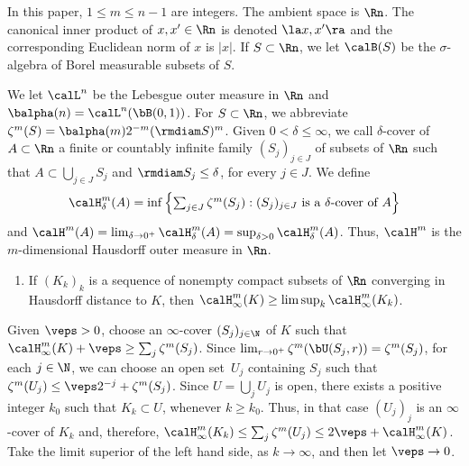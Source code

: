 \begin{Empty}[]
In this paper, $1 \leq m \leq n-1$ are integers.
The ambient space is $\Rn$.
The canonical inner product of $x,x' \in \Rn$ is denoted $\la x,x' \ra$ and the corresponding Euclidean norm of $x$ is $|x|$.
If $S \subset \Rn$, we let $\calB(S)$ be the $\sigma$-algebra of Borel measurable subsets of $S$.
\end{Empty}

\begin{Empty}
\label{h.m}
We let $\calL^n$ be the Lebesgue outer measure in $\Rn$ and $\balpha(n) = \calL^n(\bB(0,1))$.
For $S \subset \Rn$, we abbreviate $\zeta^m(S) = \balpha(m) 2^{-m}(\rmdiam S)^m$.
Given $0 < \delta \leq \infty$, we call $\delta$-cover of $A \subset \Rn$ a finite or countably infinite family $(S_j)_{j \in J}$ of subsets of $\Rn$ such that $A \subset \bigcup_{j \in J} S_j$ and $\rmdiam S_j \leq \delta$, for every $j \in J$.
We define
\begin{equation*}\textstyle
\calH^m_\delta(A) = \inf \left\{ \sum_{j \in J} \zeta^m(S_j): (S_j)_{j \in J} \text{ is a $\delta$-cover of $A$}\right\}
\end{equation*}
and $\calH^m(A) = \lim_{\delta \to 0^+} \calH^m_\delta(A) = \sup_{\delta > 0} \calH^m_\delta(A)$.
Thus, $\calH^m$ is the $m$-dimensional Hausdorff outer measure in $\Rn$.
\par
{\it
\begin{enumerate}
\item\label{enum:2.1} If $(K_k)_k$ is a sequence of nonempty compact subsets of $\Rn$ converging in Hausdorff distance to $K$, then $\calH^m_\infty(K) \geq \limsup_k \calH^m_\infty(K_k)$.
\end{enumerate}
}
\par
Given $\veps > 0$, choose an $\infty$-cover $(S_j)_{j \in \N}$ of $K$ such that $\calH^m_\infty(K) + \veps \geq \sum_j \zeta^m(S_j)$.
Since $\lim_{r \to 0^+} \zeta^m(\bU(S_j,r))=\zeta^m(S_j)$, for each $j \in \N$, we can choose an open set~$U_j$ containing $S_j$ such that $\zeta^m(U_j) \leq \veps 2^{-j} + \zeta^m(S_j)$.
Since $U = \bigcup_j U_j$ is open, there exists a positive integer $k_0$ such that $K_k \subset U$, whenever $k \geq k_0$.
Thus, in that case $(U_j)_j$ is an $\infty$-cover of $K_k$ and, therefore, $\calH^m_\infty(K_k) \leq \sum_j \zeta^m(U_j) \leq 2\veps + \calH^m_\infty(K)$.
Take the limit superior of the left hand side, as $k \to \infty$, and then let $\veps \to 0$.
\par
{\it
\begin{enumerate}

\end{enumerate}}
\end{Empty}
